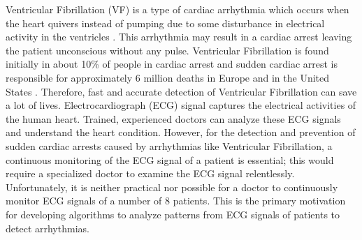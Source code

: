 \documentclass[12pt,a4paper]{article}
\begin{document}
Ventricular Fibrillation (VF) is a type of cardiac arrhythmia which occurs when the heart quivers instead of pumping due to some disturbance in electrical activity in the ventricles \cite{priori2002clinical}. This arrhythmia may result in a cardiac arrest leaving the patient unconscious without any pulse. Ventricular Fibrillation is found initially in about 10\% of people in cardiac arrest \cite{baldzizhar2016ventricular} and sudden cardiac arrest is responsible for approximately 6 million deaths in Europe and in the United States \cite{li2012algorithm}. Therefore, fast and accurate detection of Ventricular Fibrillation can save a lot of lives. Electrocardiograph (ECG) signal captures the electrical activities of the human heart. Trained, experienced doctors can analyze these ECG signals and understand the heart condition. However, for the detection and prevention of sudden cardiac arrests caused by arrhythmias like Ventricular Fibrillation, a continuous monitoring of the ECG signal of a patient is essential; this would require a specialized doctor to examine the ECG signal relentlessly. Unfortunately, it is neither practical nor possible for a doctor to continuously monitor ECG signals of a number of
8
 patients. This is the primary motivation for developing algorithms to analyze patterns from ECG signals of patients to detect arrhythmias.

\end{document}
